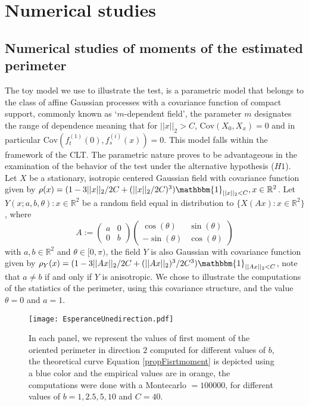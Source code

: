 \documentclass[12pt]{article}
\theoremstyle{Theorem}
\theoremstyle{definition}
\newcounter{Ax}
\begin{document}
\section{Numerical studies}
\subsection{Numerical studies of moments of the estimated perimeter}
The toy model we use to illustrate the test, is a parametric model that belongs to the class of affine Gaussian processes with a covariance function of compact support, commonly known as `$m$-dependent field', the parameter $m$ designates the range of dependence meaning that for $||x||_{2} > C$, $\text{Cov}\left(X_{0}, X_{x}\right) = 0$ and in particular $\text{Cov}\left(f_{t}^{\scriptscriptstyle (1)}(0), f_{s}^{\scriptscriptstyle (i)}(x)\right) = 0$. This model falls within the framework of the CLT. The parametric nature proves to be advantageous in the examination of the behavior of the test under the alternative hypothesis ($H1$). 
Let $X$ be a stationary, isotropic centered Gaussian field with covariance function given by $\rho(x) = (1 -3||x||_{2}/2C + (||x||_{2}/2C)^{3})\mathbbm{1}_{||x||_{2} < C}, x \in \mathbb{R}^2$.
Let ${Y(x; a, b, \theta): x \in \mathbb{R}^{2}}$ be a random field equal in distribution to  $\{X(Ax): x\in \mathbb{R}^{2}\}$, where 
\begin{equation}
\label{CovarianceAffine}
A:= \begin{pmatrix} a & 0 \\ 0 & b\end{pmatrix} \begin{pmatrix} \cos(\theta) & \sin(\theta) \\ -\sin(\theta) & \cos(\theta)\end{pmatrix} 
\end{equation}
with $a, b \in \mathbb{R}^{2}$ and $\theta \in [0, \pi)$, the field $Y$ is also Gaussian with covariance function given by  $\rho_{Y}(x) = (1 - 3||Ax||_{2}/2C + (||Ax||_{2})^{3}/2C^{3})\mathbbm{1}_{||Ax||_{2} < C}$, note that $a\neq b$ if and only if $Y$ is anisotropic. We chose to illustrate the computations of the statistics of the perimeter, using this covariance structure, and the value $\theta = 0$ and $a = 1$. 
\begin{figure}[H]
  \centering
    {\texttt{[image: EsperanceUnedirection.pdf]}}
    \hspace{0.2cm}
 \caption{In each panel, we represent the values of first moment of the oriented perimeter in direction $2$ computed for different values of $b$, the theoretical curve Equation \eqref{propFisrtmoment} is depicted using a blue color and the empirical values are in orange, the computations were done with a Montecarlo $= 100000$, for different values of $b = 1, 2.5, 5, 10$ and $C = 40$. }
\end{figure}
\end{document}
